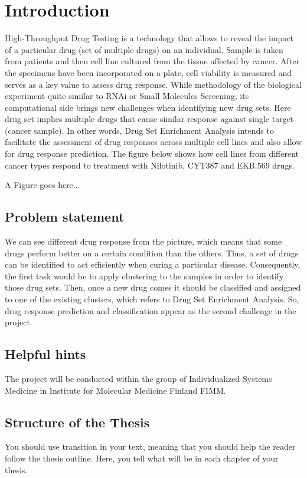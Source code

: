 \chapter{Introduction}
\label{chapter:intro}

High-Throughput Drug Testing is a technology that allows to reveal the impact of a particular drug (set of multiple drugs) on an individual. Sample is taken from patients and then cell line cultured from the tissue affected by cancer. After the specimens have been incorporated on a plate, cell viability is measured and serves as a key value to assess drug response. While methodology of the biological experiment quite similar to RNAi or Small Molecules Screening, its computational side brings new challenges when identifying new drug sets. Here drug set implies multiple drugs that cause similar response against single target (cancer sample).  In other words, Drug Set Enrichment Analysis intends to facilitate the assessment of drug responses across multiple cell lines and also allow for drug response prediction. The figure below shows how cell lines from different cancer types respond to treatment with Nilotinib, CYT387 and EKB.569 drugs.

A Figure goes here...




\section{Problem statement}

We can see different drug response from the picture, which means that some drugs perform better on a certain condition than the others. Thus, a set of drugs can be identified to act efficiently when curing a particular disease. Consequently, the first task would be to apply clustering to the samples in order to identify those drug sets. Then, once a new drug comes it should be classified and assigned to one of the existing clusters, which refers to Drug Set Enrichment Analysis. So, drug response prediction and classification appear as the second challenge in the project.

\section{Helpful hints}

The project will be conducted within the group of Individualized Systems Medicine in Institute for Molecular Medicine Finland FIMM.

\section{Structure of the Thesis}
\label{section:structure} 

You should use transition in your text, meaning that you should help
the reader follow the thesis outline. Here, you tell what will be in
each chapter of your thesis. 


